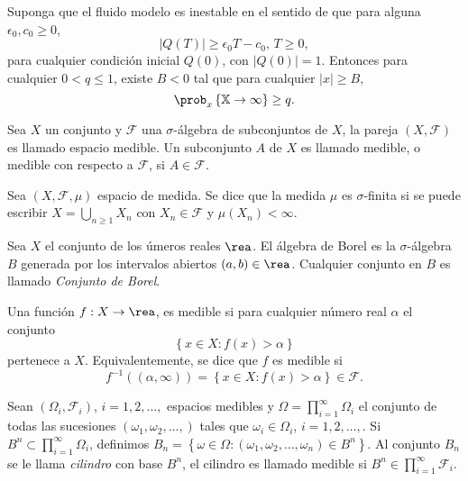 \begin{Teo}\label{Tma2.2.Down}
Suponga que el fluido modelo es inestable en el sentido de que
para alguna $\epsilon_{0},c_{0}\geq0$,
\begin{equation}\label{Eq.Inestability}
|Q\left(T\right)|\geq\epsilon_{0}T-c_{0}\textrm{,   }T\geq0,
\end{equation}
para cualquier condici\'on inicial $Q\left(0\right)$, con
$|Q\left(0\right)|=1$. Entonces para cualquier $0<q\leq1$, existe
$B<0$ tal que para cualquier $|x|\geq B$,
\begin{equation}
\prob_{x}\left\{\mathbb{X}\rightarrow\infty\right\}\geq q.
\end{equation}
\end{Teo}


\begin{Def}
Sea $X$ un conjunto y $\mathcal{F}$ una $\sigma$-\'algebra de
subconjuntos de $X$, la pareja $\left(X,\mathcal{F}\right)$ es
llamado espacio medible. Un subconjunto $A$ de $X$ es llamado
medible, o medible con respecto a $\mathcal{F}$, si
$A\in\mathcal{F}$.
\end{Def}

\begin{Def}
Sea $\left(X,\mathcal{F},\mu\right)$ espacio de medida. Se dice
que la medida $\mu$ es $\sigma$-finita si se puede escribir
$X=\bigcup_{n\geq1}X_{n}$ con $X_{n}\in\mathcal{F}$ y
$\mu\left(X_{n}\right)<\infty$.
\end{Def}

\begin{Def}\label{Cto.Borel}
Sea $X$ el conjunto de los \'umeros reales $\rea$. El \'algebra de
Borel es la $\sigma$-\'algebra $B$ generada por los intervalos
abiertos $\left(a,b\right)\in\rea$. Cualquier conjunto en $B$ es
llamado {\em Conjunto de Borel}.
\end{Def}

\begin{Def}\label{Funcion.Medible}
Una funci\'on $f:X\rightarrow\rea$, es medible si para cualquier
n\'umero real $\alpha$ el conjunto
\[\left\{x\in X:f\left(x\right)>\alpha\right\}\]
pertenece a $X$. Equivalentemente, se dice que $f$ es medible si
\[f^{-1}\left(\left(\alpha,\infty\right)\right)=\left\{x\in X:f\left(x\right)>\alpha\right\}\in\mathcal{F}.\]
\end{Def}


\begin{Def}\label{Def.Cilindros}
Sean $\left(\Omega_{i},\mathcal{F}_{i}\right)$, $i=1,2,\ldots,$
espacios medibles y $\Omega=\prod_{i=1}^{\infty}\Omega_{i}$ el
conjunto de todas las sucesiones
$\left(\omega_{1},\omega_{2},\ldots,\right)$ tales que
$\omega_{i}\in\Omega_{i}$, $i=1,2,\ldots,$. Si
$B^{n}\subset\prod_{i=1}^{\infty}\Omega_{i}$, definimos
$B_{n}=\left\{\omega\in\Omega:\left(\omega_{1},\omega_{2},\ldots,\omega_{n}\right)\in
B^{n}\right\}$. Al conjunto $B_{n}$ se le llama {\em cilindro} con
base $B^{n}$, el cilindro es llamado medible si
$B^{n}\in\prod_{i=1}^{\infty}\mathcal{F}_{i}$.
\end{Def}


